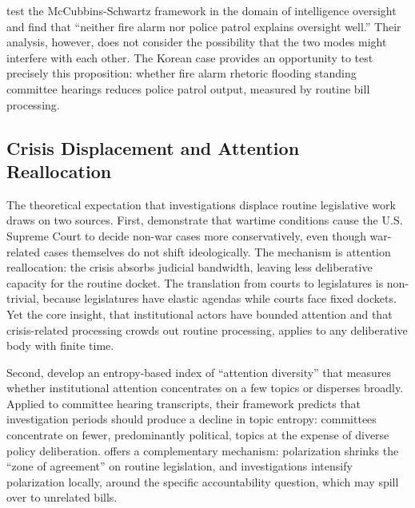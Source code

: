 \documentclass[11pt]{article}
\begin{document}
\citet{zegart2010} test the McCubbins-Schwartz framework in the domain of intelligence oversight and find that ``neither fire alarm nor police patrol explains oversight well.'' Their analysis, however, does not consider the possibility that the two modes might interfere with each other. The Korean case provides an opportunity to test precisely this proposition: whether fire alarm rhetoric flooding standing committee hearings reduces police patrol output, measured by routine bill processing.

\subsection{Crisis Displacement and Attention Reallocation}

The theoretical expectation that investigations displace routine legislative work draws on two sources. First, \citet{epstein2005} demonstrate that wartime conditions cause the U.S. Supreme Court to decide non-war cases more conservatively, even though war-related cases themselves do not shift ideologically. The mechanism is attention reallocation: the crisis absorbs judicial bandwidth, leaving less deliberative capacity for the routine docket. The translation from courts to legislatures is non-trivial, because legislatures have elastic agendas while courts face fixed dockets. Yet the core insight, that institutional actors have bounded attention and that crisis-related processing crowds out routine processing, applies to any deliberative body with finite time.

Second, \citet{boydstun2014} develop an entropy-based index of ``attention diversity'' that measures whether institutional attention concentrates on a few topics or disperses broadly. Applied to committee hearing transcripts, their framework predicts that investigation periods should produce a decline in topic entropy: committees concentrate on fewer, predominantly political, topics at the expense of diverse policy deliberation. \citet{mccarty2017} offers a complementary mechanism: polarization shrinks the ``zone of agreement'' on routine legislation, and investigations intensify polarization locally, around the specific accountability question, which may spill over to unrelated bills.
\end{document}
